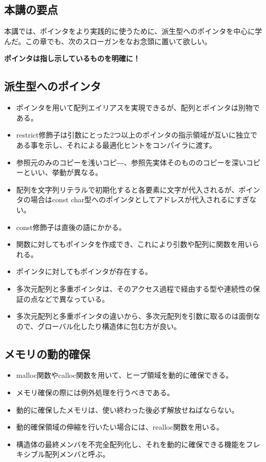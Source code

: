 \begin{shadebox}
\section*{本講の要点}
本講では、ポインタをより実践的に使うために、派生型へのポインタを中心に学んだ。この章でも、次のスローガンをなお念頭に置いて欲しい。
\begin{center}
\textbf{ポインタは指し示しているものを明確に！}
\end{center}

\subsection*{派生型へのポインタ}
\begin{itemize}
\item ポインタを用いて配列エイリアスを実現できるが、配列とポインタは別物である。
\item restrict修飾子は引数にとった2つ以上のポインタの指示領域が互いに独立である事を示し、それによる最適化ヒントをコンパイラに渡す。
\item 参照元のみのコピーを浅いコピ―、参照先実体そのもののコピーを深いコピーといい、挙動が異なる。
\item 配列を文字列リテラルで初期化すると各要素に文字が代入されるが、ポインタの場合はconst char型へのポインタとしてアドレスが代入されるにすぎない。
\item const修飾子は直後の語にかかる。
\item 関数に対してもポインタを作成でき、これにより引数や配列に関数を用いられる。
\item ポインタに対してもポインタが存在する。
\item 多次元配列と多重ポインタは、そのアクセス過程で経由する型や連続性の保証の点などで異なっている。
\item 多次元配列と多重ポインタの違いから、多次元配列を引数に取るのは面倒なので、グローバル化したり構造体に包む方が良い。
\end{itemize}

\subsection*{メモリの動的確保}
\begin{itemize}
\item malloc関数やcalloc関数を用いて、ヒープ領域を動的に確保できる。
\item メモリ確保の際には例外処理を行うべきである。
\item 動的に確保したメモリは、使い終わった後必ず解放せねばならない。
\item 動的確保領域の伸縮を行いたい場合には、realloc関数を用いる。
\item 構造体の最終メンバを不完全配列化し、それを動的に確保できる機能をフレキシブル配列メンバと呼ぶ。
\end{itemize}
\end{shadebox}
